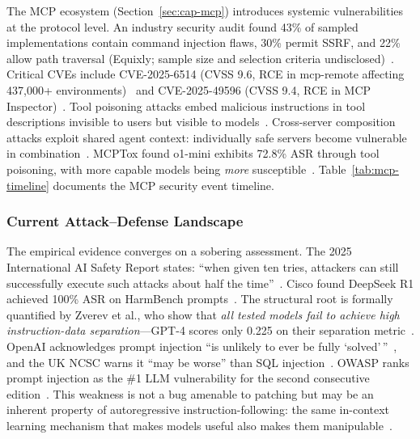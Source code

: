 The MCP ecosystem (Section~\ref{sec:cap-mcp}) introduces systemic vulnerabilities at the protocol level. An industry security audit found 43\% of sampled implementations contain command injection flaws, 30\% permit SSRF, and 22\% allow path traversal (Equixly; sample size and selection criteria undisclosed)~\cite{equixly2025mcp}. Critical CVEs include CVE-2025-6514 (CVSS 9.6, RCE in mcp-remote affecting 437,000+ environments)~\cite{jfrog2025mcpremote} and CVE-2025-49596 (CVSS 9.4, RCE in MCP Inspector)~\cite{oligo2025inspector}. Tool poisoning attacks embed malicious instructions in tool descriptions invisible to users but visible to models~\cite{invariant2025toolpoisoning}. Cross-server composition attacks exploit shared agent context: individually safe servers become vulnerable in combination~\cite{invariant2025whatsapp,croce2025trivial}. MCPTox found o1-mini exhibits 72.8\% ASR through tool poisoning, with more capable models being \emph{more} susceptible~\cite{wang2025mcptox}. Table~\ref{tab:mcp-timeline} documents the MCP security event timeline.




\subsubsection{Current Attack--Defense Landscape}
\label{sec:threat-landscape}

The empirical evidence converges on a sobering assessment. The 2025 International AI Safety Report states: ``when given ten tries, attackers can still successfully execute such attacks about half the time''~\cite{aisafetyreport2025}. Cisco found DeepSeek R1 achieved 100\% ASR on HarmBench prompts~\cite{cisco2025deepseek}. The structural root is formally quantified by Zverev et al., who show that \emph{all tested models fail to achieve high instruction-data separation}---GPT-4 scores only 0.225 on their separation metric~\cite{zverev2025separation}. OpenAI acknowledges prompt injection ``is unlikely to ever be fully `solved'\,''~\cite{openai2025atlas}, and the UK NCSC warns it ``may be worse'' than SQL injection~\cite{ncsc2025promptinjection}. OWASP ranks prompt injection as the \#1 LLM vulnerability for the second consecutive edition~\cite{owasp2025}. This weakness is not a bug amenable to patching but may be an inherent property of autoregressive instruction-following: the same in-context learning mechanism that makes models useful also makes them manipulable~\cite{zverev2025separation}.

